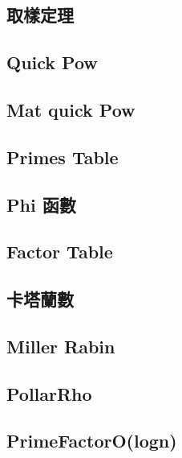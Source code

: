 \subsection{取樣定理}


\subsection{Quick Pow}


\subsection{Mat quick Pow}


\subsection{Primes Table}


\subsection{Phi 函數}


\subsection{Factor Table}


\subsection{卡塔蘭數}


\subsection{Miller Rabin}


\subsection{PollarRho}


\subsection{PrimeFactorO(logn)}



